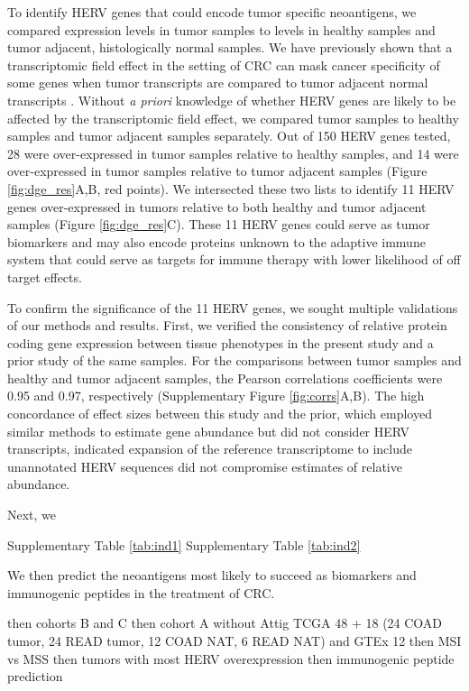 \documentclass[11pt,letterpaper]{article}
\begin{document}
To identify HERV genes that could encode tumor specific neoantigens, we compared expression levels in tumor samples to levels in healthy samples and tumor adjacent, histologically normal samples.
We have previously shown that a transcriptomic field effect in the setting of CRC can mask cancer specificity of some genes when tumor transcripts are compared to tumor adjacent normal transcripts \citep{Dampier2020}.
Without \emph{a priori} knowledge of whether HERV genes are likely to be affected by the transcriptomic field effect, we compared tumor samples to healthy samples and tumor adjacent samples separately.
Out of 150 HERV genes tested, 28 were over-expressed in tumor samples relative to healthy samples, and 14 were over-expressed in tumor samples relative to tumor adjacent samples (Figure \ref{fig:dge_res}A,B, red points).
We intersected these two lists to identify 11 HERV genes over-expressed in tumors relative to both healthy and tumor adjacent samples (Figure \ref{fig:dge_res}C).
These 11 HERV genes could serve as tumor biomarkers and may also encode proteins unknown to the adaptive immune system that could serve as targets for immune therapy with lower likelihood of off target effects.

To confirm the significance of the 11 HERV genes, we sought multiple validations of our methods and results.
First, we verified the consistency of relative protein coding gene expression between tissue phenotypes in the present study and a prior study of the same samples.
For the comparisons between tumor samples and healthy and tumor adjacent samples, the Pearson correlations coefficients were 0.95 and 0.97, respectively (Supplementary Figure \ref{fig:corrs}A,B).
The high concordance of effect sizes between this study and the prior, which employed similar methods to estimate gene abundance but did not consider HERV transcripts, indicated expansion of the reference transcriptome to include unannotated HERV sequences did not compromise estimates of relative abundance.

Next, we


Supplementary Table \ref{tab:ind1}
Supplementary Table \ref{tab:ind2}


We then predict the neoantigens most likely to succeed as biomarkers and immunogenic peptides in the treatment of CRC.


then cohorts B and C
then cohort A without Attig TCGA 48 + 18 (24 COAD tumor, 24 READ tumor, 12 COAD NAT, 6 READ NAT) and GTEx 12
then MSI vs MSS
then tumors with most HERV overexpression
then immunogenic peptide prediction
\end{document}
